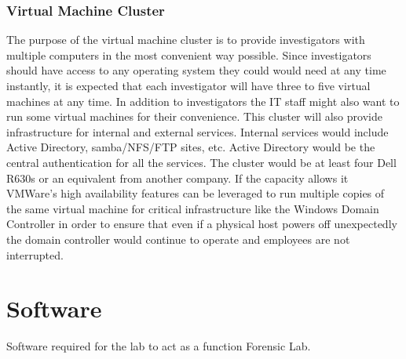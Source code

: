 \documentclass{article}
\begin{document}
\subsubsection{Virtual Machine Cluster} The purpose of the virtual machine cluster is to provide investigators with multiple computers in the most convenient way possible. Since investigators should have access to any operating system they could would need at any time instantly, it is expected that each investigator will have three to five virtual machines at any time. In addition to investigators the IT staff might also want to run some virtual machines for their convenience. This cluster will also provide infrastructure for internal and external services. Internal services would include Active Directory, samba/NFS/FTP sites, etc. Active Directory would be the central authentication for all the services. The cluster would be at least four Dell R630s or an equivalent from another company. If the capacity allows it VMWare's high availability features can be leveraged to run multiple copies of the same virtual machine for critical infrastructure like the Windows Domain Controller in order to ensure that even if a physical host powers off unexpectedly the domain controller would continue to operate and employees are not interrupted. 


\section{Software}
Software required for the lab to act as a function Forensic Lab.
\end{document}
